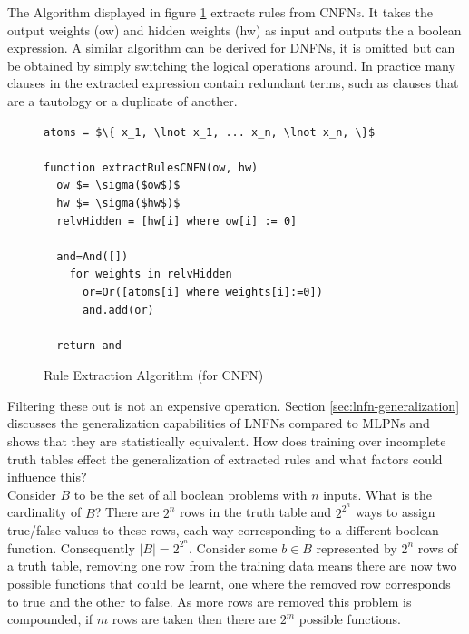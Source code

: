 \noindent
\begin{minipage}[t]{0.3\textwidth}
\vspace{0px}
The Algorithm displayed in figure \ref{alg:rule-extraction} extracts rules from CNFNs. It takes the output weights (ow) and hidden weights (hw) as input and outputs the a boolean expression. A similar algorithm can be derived for DNFNs, it is omitted but can be obtained by simply switching the logical operations around. In practice many clauses in the extracted expression contain redundant terms, such as clauses that are a tautology or a duplicate of another.\\
\end{minipage}
\hspace{0.05\textwidth}
\begin{minipage}[t]{0.65\textwidth}
\vspace{0px}
\begin{figure}[H]
	\begin{lstlisting}[mathescape=true]
atoms = $\{ x_1, \lnot x_1, ... x_n, \lnot x_n, \}$
	
function extractRulesCNFN(ow, hw)
  ow $= \sigma($ow$)$
  hw $= \sigma($hw$)$
  relvHidden = [hw[i] where ow[i] := 0]
		
  and=And([])
    for weights in relvHidden
      or=Or([atoms[i] where weights[i]:=0])
      and.add(or)
		
  return and
	\end{lstlisting}
	\caption{Rule Extraction Algorithm (for CNFN)}
	\label{alg:rule-extraction}
\end{figure}
\end{minipage}

Filtering these out is not an expensive operation. Section \ref{sec:lnfn-generalization} discusses the generalization capabilities of LNFNs compared to MLPNs and shows that they are statistically equivalent. How does training over incomplete truth tables effect the generalization of extracted rules and what factors could influence this?\\

Consider $B$ to be the set of all boolean problems with $n$ inputs. What is the cardinality of $B$? There are $2^n$ rows in the truth table and $2^{2^n}$ ways to assign true/false values to these rows, each way corresponding to a different boolean function. Consequently $|B| = 2^{2^n}$. Consider some $b \in B$ represented by $2^n$ rows of a truth table, removing one row from the training data means there are now two possible functions that could be learnt, one where the removed row corresponds to true and the other to false. As more rows are removed this problem is compounded, if $m$ rows are taken then there are $2^m$ possible functions.\\

